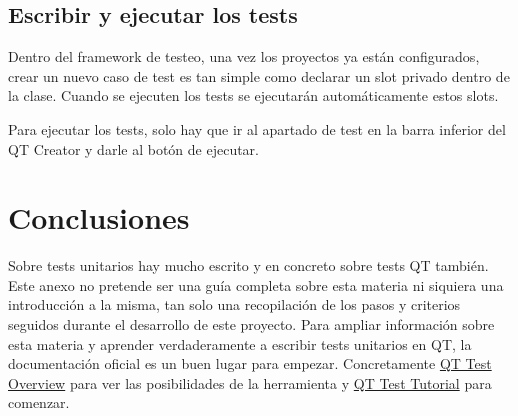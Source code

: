 \subsection{Escribir y ejecutar los tests}

Dentro del framework de testeo, una vez los proyectos ya están configurados, crear un nuevo caso de test es tan simple como declarar un slot privado dentro de la clase. Cuando se ejecuten los tests se ejecutarán automáticamente estos slots.

Para ejecutar los tests, solo hay que ir al apartado de test en la barra inferior del QT Creator y darle al botón de ejecutar.

\section{Conclusiones}

Sobre tests unitarios hay mucho escrito y en concreto sobre tests QT también. Este anexo no pretende ser una guía completa sobre esta materia ni siquiera una introducción a la misma, tan solo una recopilación de los pasos y criterios seguidos durante el desarrollo de este proyecto. Para ampliar información sobre esta materia y aprender verdaderamente a escribir tests unitarios en QT, la documentación oficial es un buen lugar para empezar. Concretamente \href{https://doc.qt.io/qt-5/qtest-overview.html}{QT Test Overview} \cite{QTTestOverview} para ver las posibilidades de la herramienta y \href{https://doc.qt.io/qt-5/qtest-tutorial.html}{QT Test Tutorial} \cite{QTTesTutorial} para comenzar.

\chapterend
